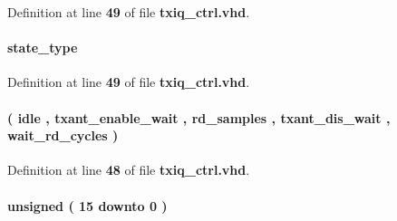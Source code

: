 Definition at line {\bf 49} of file {\bf txiq\+\_\+ctrl.\+vhd}.

\paragraph[{next\+\_\+state}]{ {\bfseries {\bfseries {\bf state\+\_\+type}} \textcolor{vhdlchar}{ }} \hspace{0.3cm}{\ttfamily [Signal]}}\label{classtxiq__ctrl_1_1arch_a7b92f98d060e763f3dd6fa727ddb03d8}


Definition at line {\bf 49} of file {\bf txiq\+\_\+ctrl.\+vhd}.

\paragraph[{state\+\_\+type}]{ {\bfseries \textcolor{vhdlchar}{(}\textcolor{vhdlchar}{ }\textcolor{vhdlchar}{idle}\textcolor{vhdlchar}{ }\textcolor{vhdlchar}{,}\textcolor{vhdlchar}{ }\textcolor{vhdlchar}{txant\+\_\+enable\+\_\+wait}\textcolor{vhdlchar}{ }\textcolor{vhdlchar}{,}\textcolor{vhdlchar}{ }\textcolor{vhdlchar}{rd\+\_\+samples}\textcolor{vhdlchar}{ }\textcolor{vhdlchar}{,}\textcolor{vhdlchar}{ }\textcolor{vhdlchar}{txant\+\_\+dis\+\_\+wait}\textcolor{vhdlchar}{ }\textcolor{vhdlchar}{,}\textcolor{vhdlchar}{ }\textcolor{vhdlchar}{wait\+\_\+rd\+\_\+cycles}\textcolor{vhdlchar}{ }\textcolor{vhdlchar}{)}\textcolor{vhdlchar}{ }} \hspace{0.3cm}{\ttfamily [Type]}}\label{classtxiq__ctrl_1_1arch_a66b569dbb5c8417559e9ef0a59224a71}


Definition at line {\bf 48} of file {\bf txiq\+\_\+ctrl.\+vhd}.

\paragraph[{txant\+\_\+dis\+\_\+wait\+\_\+cnt}]{ {\bfseries \textcolor{comment}{unsigned}\textcolor{vhdlchar}{ }\textcolor{vhdlchar}{(}\textcolor{vhdlchar}{ }\textcolor{vhdlchar}{ } \textcolor{vhdldigit}{15} \textcolor{vhdlchar}{ }\textcolor{keywordflow}{downto}\textcolor{vhdlchar}{ }\textcolor{vhdlchar}{ } \textcolor{vhdldigit}{0} \textcolor{vhdlchar}{ }\textcolor{vhdlchar}{)}\textcolor{vhdlchar}{ }} \hspace{0.3cm}{\ttfamily [Signal]}}\label{classtxiq__ctrl_1_1arch_a1f4684468423f2e77d93810b5e556e8b}


